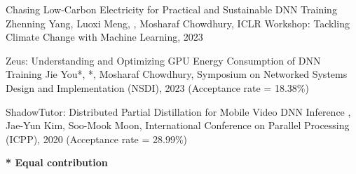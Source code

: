 



\begin{cvlist}

  \cvlistitem
    {Chasing Low-Carbon Electricity for Practical and Sustainable DNN Training} %
    {Zhenning Yang, Luoxi Meng, , Mosharaf Chowdhury, ICLR Workshop: Tackling Climate Change with Machine Learning, 2023} %

  \cvlistitem
    {Zeus: Understanding and Optimizing GPU Energy Consumption of DNN Training} %
    {Jie You*, *, Mosharaf Chowdhury, Symposium on Networked Systems Design and Implementation (NSDI), 2023 (Acceptance rate = 18.38\%)} %

  \cvlistitem
    {ShadowTutor: Distributed Partial Distillation for Mobile Video DNN Inference} %
    {, Jae-Yun Kim, Soo-Mook Moon, International Conference on Parallel Processing (ICPP), 2020 (Acceptance rate = 28.99\%)} %

\end{cvlist}

\vspace{-5mm}
\begin{cvparagraph}
  \textbf{* Equal contribution}
\end{cvparagraph}
